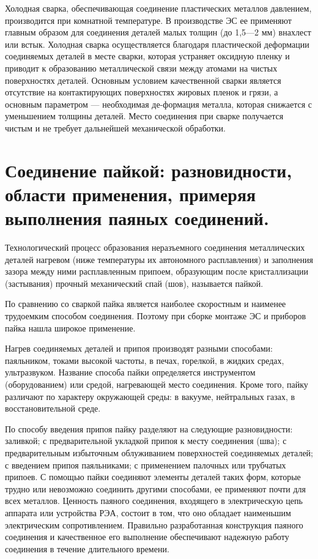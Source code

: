 \documentclass[unicode, 12pt, a4paper, oneside]{article}
\begin{document}
Холодная сварка, обеспечивающая соединение пластических металлов давлением, производится при комнатной температуре. В производстве ЭС ее применяют главным образом для соединения деталей малых толщин (до 1,5—2 мм) внахлест или встык. Холодная сварка осуществляется благодаря пластической деформации соединяемых деталей в месте сварки, которая устраняет оксидную пленку и  приводит к образованию металлической связи между атомами на чистых поверхностях деталей. Основным условием качественной сварки является отсутствие на контактирующих поверхностях жировых пленок и грязи, а основным параметром — необходимая де-формация металла, которая снижается с уменьшением толщины деталей. Место соединения при сварке получается чистым и не требует дальнейшей механической обработки.


\section{Соединение пайкой: разновидности, области применения, примеряя выполнения паяных соединений.}

Технологический процесс образования неразъемного соединения металлических деталей нагревом (ниже температуры их автономного расплавления) и заполнения зазора между ними расплавленным припоем, образующим после кристаллизации (застывания) прочный механический спай (шов),  называется пайкой.

По сравнению со сваркой пайка является наиболее скоростным и наименее трудоемким способом соединения. Поэтому при сборке монтаже ЭС и приборов пайка нашла широкое применение.

Нагрев соединяемых деталей и припоя производят разными способами: паяльником, токами высокой частоты, в печах, горелкой, в жидких средах, ультразвуком. Название способа пайки определяется инструментом (оборудованием) или средой, нагревающей место соединения. Кроме того, пайку различают по характеру окружающей среды: в вакууме, нейтральных газах, в восстановительной среде.

По способу введения припоя пайку разделяют на следующие разновидности: заливкой; с предварительной укладкой припоя к месту соединения (шва); с предварительным избыточным облуживанием поверхностей соединяемых деталей; с введением припоя паяльниками;  с применением палочных  или трубчатых припоев.  С помощью пайки  соединяют элементы деталей таких форм, которые трудно или невозможно соединить другими способами, ее применяют почти для всех металлов. Ценность паяного соединения, входящего в электрическую цепь аппарата или устройства РЭА, состоит в том, что оно обладает наименьшим электрическим сопротивлением. Правильно разработанная конструкция паяного соединения и качественное его выполнение обеспечивают надежную работу соединения в течение длительного времени.
\end{document}
